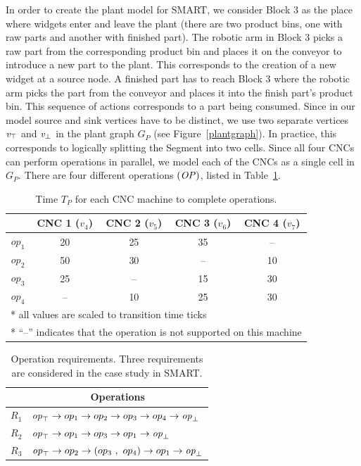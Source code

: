 In order to create the plant model for SMART, we consider Block 3 as the place where widgets enter and leave the plant (there are two product bins, one with raw parts and another with finished part).
The robotic arm in Block 3 picks a raw part from the corresponding product bin and places it on the conveyor to introduce a new part to the plant.
This corresponds to the creation of a new widget at a source node. 
A finished part has to reach Block 3 where the robotic arm picks the part from the conveyor and places it into the finish part's product bin. This sequence of actions corresponds to a part being consumed.
%
Since in our model source and sink vertices have to be distinct, we  use two separate vertices $\mathit{v}_\top$ and $\mathit{v}_\bot$  in the plant graph $G_P$ (see Figure~\ref{plantgraph}). 
In practice, this corresponds to logically splitting the Segment into two cells.
%
%
Since all four CNCs can perform operations in parallel, we model each of the CNCs as a single cell in $G_P$.
There are four different operations $(\mathit{OP})$, listed in Table~\ref{tab:smart_operation_time}.
\begin{table}[!t]
\centering
\caption{\small Time $T_P$ for each CNC machine to complete operations.}
\label{tab:smart_operation_time}
\begin{tabular}{|c|c|c|c|c|}
\hline 
 & CNC 1 ($v_4$) & CNC 2 ($v_5$) & CNC 3 ($v_6$) & CNC 4 ($v_7$) \\ 
\hline \hline
$op_1$ & 20 & 25 & 35 & -- \\ 
\hline 
$op_2$ & 50 & 30 & -- & 10 \\ 
\hline 
$op_3$ & 25 & -- & 15 & 30 \\ 
\hline 
$op_4$ & -- & 10 & 25 & 30 \\ 
\hline 
\multicolumn{5}{l}{* all values are scaled to transition time ticks} \\
\multicolumn{5}{l}{* ``--'' indicates that the operation is not supported on this machine}
\end{tabular} 
\end{table}

\begin{table}[!t]
\centering
\caption{Operation requirements. Three requirements are considered in the case study in SMART.}
\label{tab:smart_requirements}
\begin{tabular}{|c|l|}
\hline
 & \multicolumn{1}{c|}{Operations}            \\ \hline \hline
$R_1$         & $\mathit{op}_\top \rightarrow op_1 \rightarrow op_2 \rightarrow op_3 \rightarrow op_4 \rightarrow \mathit{op}_\bot$ \\ \hline
$R_2$         & $\mathit{op}_\top \rightarrow op_1 \rightarrow op_3 \rightarrow op_1 \rightarrow \mathit{op}_\bot$  \\ \hline
$R_3$         & $\mathit{op}_\top \rightarrow op_2 \rightarrow (op_3\ , \ op_4) \rightarrow op_1 \rightarrow \mathit{op}_\bot$  \\ \hline
\end{tabular}
\end{table}    


